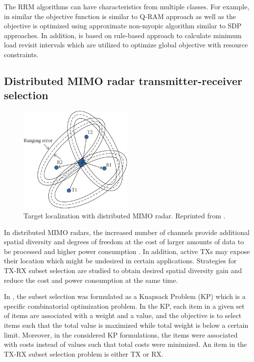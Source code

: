 \documentclass[english, 12pt, a4paper, elec, utf8, a-1b, online]{aaltothesis}
\begin{document}
\noindent
The RRM algorithms can have characteristics from multiple classes. 
For example, in \cite{Byrne2015, Byrne2016} similar the objective function is similar to Q-RAM approach as well as the objective is optimized using approximate non-myopic algorithm similar to SDP approaches.
In addition, \cite{Esfahani2012} is based on rule-based approach to calculate minimum load revisit intervals which are utilized to optimize global objective with resource constraints. 



\subsection{Distributed MIMO radar transmitter-receiver selection}\label{sec:TX_RX_selection_review}

\begin{figure}[b]
    \centering
    \includegraphics[width=0.5\textwidth]{figures/background/MIMO_TX_RX_selection.png}
    \caption{Target localization with distributed MIMO radar. Reprinted from \cite{Sun2014}.}
    \label{fig:dist_MIMO_localization}
\end{figure}


In distributed MIMO radars, the increased number of channels provide additional spatial diversity and degrees of freedom at the cost of larger amounts of data to be processed and higher power consumption \cite{Haimovich2008}.
In addition, active TXs may expose their location which might be undesired in certain applications.
Strategies for TX-RX subset selection are studied to obtain desired spatial diversity gain and reduce the cost and power consumption at the same time.

In \cite{Godrich2011a, Godrich2011}, the subset selection was formulated as a Knapsack
Problem (KP) which is a specific combinatorial optimization problem.
In the KP, each item in a given set of items are associated with a weight and a value, and the objective is to select items such that the total value is maximized while total weight is below a certain limit.
Moreover, in the considered KP formulations, the items were associated with costs instead of values such that total costs were minimized.
An item in the TX-RX subset selection problem is either TX or RX.
\end{document}
